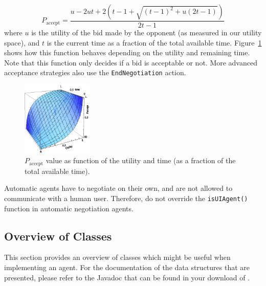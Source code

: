 \documentclass[]{article}
\begin{document}
\begin{equation}
	P_\text{accept} = \dfrac{u - 2ut + 2\left(t - 1 + \sqrt{(t - 1)^2 + u(2t - 1)}\right)}{2t - 1}
\end{equation}
where $u$ is the utility of the bid made by the opponent (as measured in our utility space), and $t$ is the current time as a fraction of the total available time. Figure~\ref{Fig:Paccept} shows how this function behaves depending on the utility and remaining time. Note that this function only decides if a bid is acceptable or not. More advanced acceptance strategies also use the \texttt{EndNegotiation} action.
\begin{figure}[htb]
	\centering
	\includegraphics[width=0.3\textwidth]{media/image21.png}
	\caption{$P_\text{accept}$ value as function of the utility and time (as a fraction of the total available time).}\label{Fig:Paccept}
\end{figure}
 
Automatic agents have to negotiate on their own, and are not allowed to communicate with a human user. Therefore, do not override the \texttt{isUIAgent()} function in automatic negotiation agents.

\subsection{Overview of Classes}
This section provides an overview of classes which might be useful when implementing an agent. For the documentation of the data structures that are presented, please refer to the Javadoc that can be found in your download of \Genius. 
\end{document}
